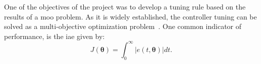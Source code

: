 \begin{refsection}
%
%
One of the objectives of the project was to develop a tuning rule based on the results of a \gls{moo} problem. As it is widely established, the controller tuning can be solved as a multi-objective optimization problem~\cite{Gambier2007}. One common indicator of performance, is the \gls{iae} given by:
%
\begin{equation}  %
J(\bm{\theta})=\int_0^\infty \left |{e(t,\bm{\theta})}\right | dt.
\label{IAE}
\end{equation}


\end{refsection}
